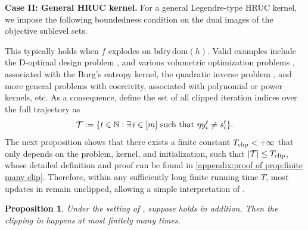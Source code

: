 \documentclass{article}
\theoremstyle{plain}
\newtheorem{proposition}[theorem]{Proposition}
\theoremstyle{definition}
\newtheorem{assumption}[theorem]{Assumption}
\theoremstyle{remark}
\newcommand{\R}{\mathbb{R}}
\newcommand{\N}{\mathbb{N}}
\newcommand{\dom}[1]{\mathrm{dom}(#1)}
\begin{document}
\noindent\textbf{Case II: General HRUC kernel.} For a general Legendre-type HRUC kernel, we impose the following boundedness condition on the dual images of the objective sublevel sets.
This typically holds when $f$ explodes on $\mathrm{bdry\,}\dom{h}$. Valid examples include the D-optimal design problem \cite{atwood1969optimal,kiefer1960equivalence,lu2018relatively}, and various volumetric optimization problems \cite{anstreicher2000volumetric,lu2018relatively}, associated with the Burg's  entropy kernel, the quadratic inverse problem \cite{bolte2018first}, and more general problems with coercivity, associated with polynomial or power kernels, etc. As a consequence, define the set of all clipped iteration indices over the full trajectory as 
$${\cal T}:=\{t\in\N:\exists \,i\in[m] \text{ such that } \eta y_i^t \neq s_i^t\}.$$ 
The next proposition shows that there exists a finite constant $T_{\rm clip}<+\infty$ that only depends on the problem, kernel, and initialization, such that  $|{\cal T}|\leq T_{\rm clip}$, whose detailed definition and proof can be found in \cref{appendix:proof of prop:finite many clip}. Therefore, within any sufficiently long finite running time $T$, most updates in  remain unclipped, allowing a simple interpretation of . 
\begin{proposition}\label{prop:finite many clip}
    Under the setting of , suppose  holds in addition. Then the clipping in  happens at most finitely many times.
\end{proposition}
\end{document}
